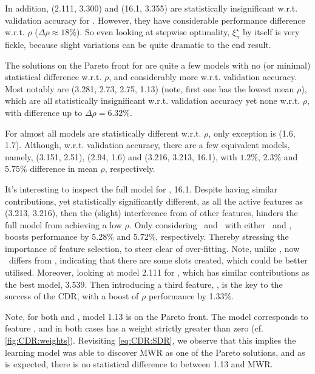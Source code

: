 In addition, (2.111, 3.300) and (16.1, 3.355) are statistically insignificant 
w.r.t. validation accuracy for . However, they have considerable 
performance difference w.r.t. $\rho$ ($\Delta\rho \approx 18\%$). 
So even looking at stepwise optimality, $\xi_{\pi}^{\star}$ by itself is very 
fickle, because slight variations can be quite dramatic to the end result. 

The solutions on the Pareto front for  are quite a few models
with no (or minimal) statistical difference w.r.t. $\rho$, and 
considerably more w.r.t. validation accuracy. 
Most notably are (3.281, 2.73, 2.75, 1.13)
(note, first one has the lowest mean $\rho$), which are all statistically 
insignificant w.r.t. validation accuracy yet none w.r.t. $\rho$, with 
difference up to $\Delta\rho=6.32\%$.

For  almost all models are statistically different w.r.t. $\rho$, 
only exception is (1.6, 1.7).
Although, w.r.t. validation accuracy, there are a few equivalent models, 
namely, (3.151, 2.51), (2.94, 1.6) and (3.216, 3.213, 16.1), with $1.2\%$, 
$2.3\%$ and $5.75\%$ difference in mean $\rho$, respectively. 

It's interesting to inspect the full model for , 16.1. 
Despite having similar contributions, yet statistically significantly 
different, as all the active features as (3.213, 3.216), then the (slight) 
interference from of other features, hinders the full model from achieving a 
low $\rho$. 
Only considering \phijobOps\ and \phimacOps\ with either \phiendTime\ and 
\phimacFree, boosts performance by 5.28\% and 5.72\%, respectively. 
Thereby stressing the importance of feature selection, to steer clear of 
over-fitting. Note, unlike , now \phiendTime\ differs from 
\phimacFree, indicating that there are some slots created, which could be 
better utilised.
Moreover, looking at model 2.111 for , which has similar 
contributions as the best model, 3.539. Then introducing a third feature, 
\phimacWrm, is the key to the success of the CDR, with a boost of $\rho$ 
performance by 1.33\%. 

Note, for both  and , model 1.13 is on the Pareto 
front. The model corresponds to feature \phijobWrm, and in both cases has a 
weight strictly greater than zero (cf. \cref{fig:CDR:weights}). Revisiting 
\cref{eq:CDR:SDR}, we observe that this implies the learning 
model was able to discover MWR as one of the Pareto solutions, and as is 
expected, there is no statistical difference to between 1.13 and MWR.

